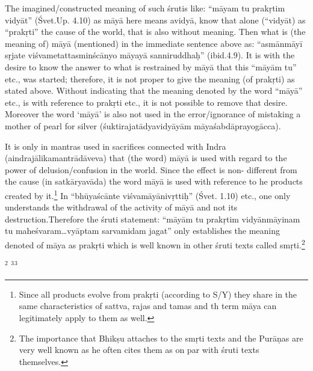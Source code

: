 The imagined/constructed meaning of such śrutis like: “māyam tu prakṛtim vidyāt” (Śvet.Up. 4.10)  as māyā here means avidyā, know that alone (“vidyāt) as “prakṛti” the cause of the world, that is also without meaning. Then what is (the meaning of) māyā (mentioned) in the immediate sentence above as: “asmānmāyī sṛjate viśvametattasminścānyo māyayā sanniruddhaḥ” (ibid.4.9). It is with the desire to know the answer to what is restrained by māyā that this “māyām tu” etc., was started; therefore, it is not proper to give the meaning (of prakṛti) as stated above. Without indicating that the meaning denoted by the word “māyā” etc., is with reference to prakṛti etc., it is not possible to remove that desire. Moreover the word ‘māyā’ is also not used in the error/ignorance of mistaking a mother of pearl for silver (śuktirajatādyavidyāyām māyaśabdāprayogācca).

It is only in mantras used in sacrifices connected with Indra (aindrajālikamantrādāveva) that (the word) māyā is used with regard to the power of delusion/confusion in the world. Since the effect is non- different from the cause (in satkāryavāda) the word māyā is used with reference to he products created by it.\footnote{Since all products evolve from prakṛti (according to S/Y) they share in the same characteristics of sattva, rajas and tamas and th term māya can legitimately apply to them as well.} In “bhūyaścānte viśvamāyānivṛttiḥ” (Śvet. 1.10) etc., one only understands the withdrawal of the activity of māyā and not its destruction.Therefore the śruti statement: “māyām tu prakṛtim vidyānmāyinam tu maheśvaram…vyāptam sarvamidam jagat” only establishes the meaning denoted of māya as prakṛti which is well known in other śruti texts called smṛti.\footnote{The importance that Bhikṣu attaches to the smṛti texts and the Purāṇas are very well known as he often
cites them as on par with śruti texts themselves.}

$^{2}$  $^{3}$$^{3}$ 


